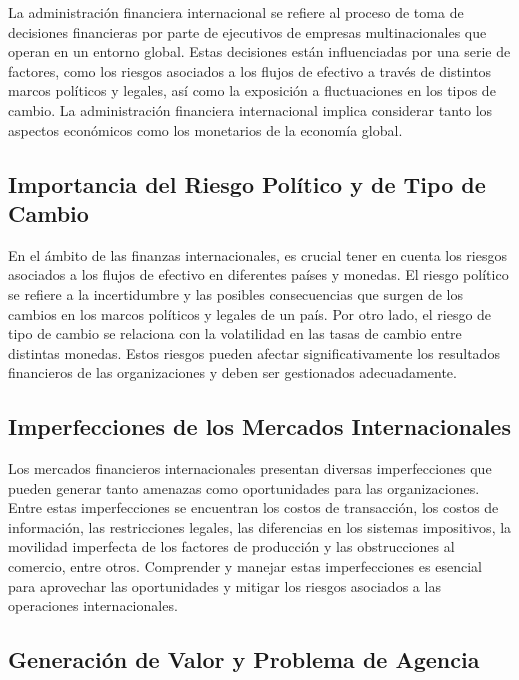 \documentclass[
  jou,
  floatsintext,
  longtable,
  a4paper,
  nolmodern,
  notxfonts,
  notimes,
  12pt,
  colorlinks=true,linkcolor=blue,citecolor=blue,urlcolor=blue]{apa7}
\begin{document}
La administración financiera internacional se refiere al proceso de toma
de decisiones financieras por parte de ejecutivos de empresas
multinacionales que operan en un entorno global. Estas decisiones están
influenciadas por una serie de factores, como los riesgos asociados a
los flujos de efectivo a través de distintos marcos políticos y legales,
así como la exposición a fluctuaciones en los tipos de cambio. La
administración financiera internacional implica considerar tanto los
aspectos económicos como los monetarios de la economía global.

\subsection{Importancia del Riesgo Político y de Tipo de
Cambio}\label{importancia-del-riesgo-poluxedtico-y-de-tipo-de-cambio}

En el ámbito de las finanzas internacionales, es crucial tener en cuenta
los riesgos asociados a los flujos de efectivo en diferentes países y
monedas. El riesgo político se refiere a la incertidumbre y las posibles
consecuencias que surgen de los cambios en los marcos políticos y
legales de un país. Por otro lado, el riesgo de tipo de cambio se
relaciona con la volatilidad en las tasas de cambio entre distintas
monedas. Estos riesgos pueden afectar significativamente los resultados
financieros de las organizaciones y deben ser gestionados adecuadamente.

\subsection{Imperfecciones de los Mercados
Internacionales}\label{imperfecciones-de-los-mercados-internacionales}

Los mercados financieros internacionales presentan diversas
imperfecciones que pueden generar tanto amenazas como oportunidades para
las organizaciones. Entre estas imperfecciones se encuentran los costos
de transacción, los costos de información, las restricciones legales,
las diferencias en los sistemas impositivos, la movilidad imperfecta de
los factores de producción y las obstrucciones al comercio, entre otros.
Comprender y manejar estas imperfecciones es esencial para aprovechar
las oportunidades y mitigar los riesgos asociados a las operaciones
internacionales.

\subsection{Generación de Valor y Problema de
Agencia}\label{generaciuxf3n-de-valor-y-problema-de-agencia}
\end{document}
